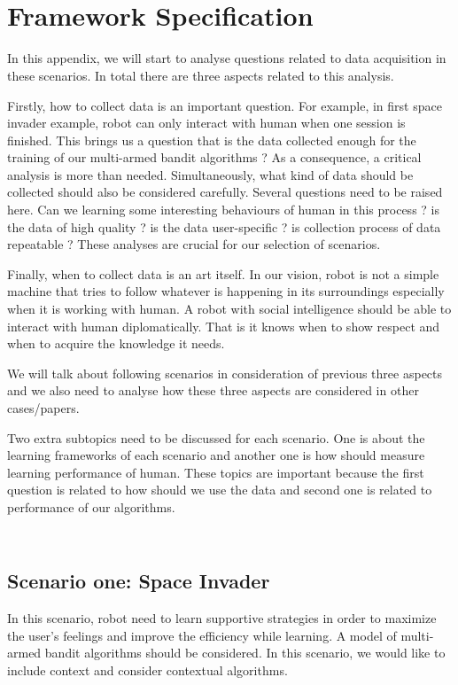 \documentclass{book}
\begin{document}
\newpage
\appendix
\section{\\Framework Specification} \label{App:AppendixA}

In this appendix, we will start to analyse questions related to data acquisition in these scenarios. In total there are three aspects related to this analysis. 

Firstly, how to collect data is an important question.  For example, in first space invader example, robot can only interact with human when one session is finished. This brings us a question that is the data collected enough for the training of our multi-armed bandit algorithms ? As a consequence, a critical analysis is more than needed.
Simultaneously,  what kind of data should be collected should also be considered carefully. Several questions need to be raised here. Can we learning some interesting behaviours of human in this process ? is the data of high quality ? is the data user-specific ? is collection process of data repeatable ? These analyses are crucial for our selection of scenarios.

Finally, when to collect data is an art itself. In our vision, robot is not a simple machine that tries to follow whatever is happening in its surroundings especially when it is working with human.  A robot with social intelligence should be able to interact with human diplomatically. That is it knows when to show respect and when to acquire the knowledge it needs.

We will talk about following scenarios in consideration of previous three aspects and we also need to analyse how these three aspects are considered in other cases/papers.

Two extra subtopics need to be discussed for each scenario. One is about the learning frameworks of each scenario and another one is how should measure learning performance of human. These topics are important because the first question is related to how should we use the data and second one is related to performance of our algorithms.
\subsection{\\Scenario one: Space Invader}
In this scenario,  robot need to learn supportive strategies in order to maximize the user’s feelings and improve the efficiency while learning. A model of multi-armed bandit algorithms should be considered. In this scenario, we would like to include context and consider contextual algorithms.
\end{document}
